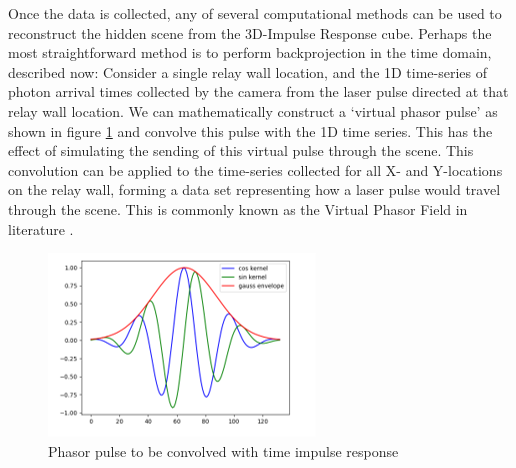 \documentclass[conference]{IEEEtran}
\begin{document}
Once the data is collected, any of several computational methods \cite{velten2012, Liu2019, Nam2020} can be used to reconstruct the hidden scene from the 3D-Impulse Response cube. Perhaps the most straightforward method is to perform backprojection in the time domain, described now: Consider a single relay wall location, and the 1D time-series of photon arrival times collected by the camera from the laser pulse directed at that relay wall location. We can mathematically construct a `virtual phasor pulse' as shown in figure \ref{fig:virtualpulse} and convolve this pulse with the 1D time series. This has the effect of simulating the sending of this virtual pulse through the scene. This convolution can be applied to the time-series collected for all X- and Y-locations on the relay wall, forming a data set representing how a laser pulse would travel through the scene. This is commonly known as the Virtual Phasor Field in literature \cite{Liu2019}.

\begin{figure}
    \centering
    \includegraphics[width=0.6\columnwidth]{figures/phasor_pulse_short.png}
    \caption{Phasor pulse to be convolved with time impulse response}
    \label{fig:virtualpulse}
\end{figure}
\end{document}
